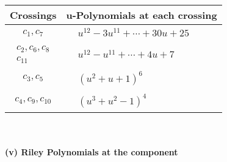 \documentclass[1p]{elsarticle_modified}
\theoremstyle{definition}
\begin{document}
\begin{tabular}{m{50pt}|m{274pt}}
Crossings & \hspace{64pt}u-Polynomials at each crossing \\
\hline $$\begin{aligned}c_{1},c_{7}\end{aligned}$$&$\begin{aligned}
&u^{12}-3 u^{11}+\cdots+30 u+25
\end{aligned}$\\
\hline $$\begin{aligned}c_{2},c_{6},c_{8}\\c_{11}\end{aligned}$$&$\begin{aligned}
&u^{12}- u^{11}+\cdots+4 u+7
\end{aligned}$\\
\hline $$\begin{aligned}c_{3},c_{5}\end{aligned}$$&$\begin{aligned}
&(u^2+u+1)^6
\end{aligned}$\\
\hline $$\begin{aligned}c_{4},c_{9},c_{10}\end{aligned}$$&$\begin{aligned}
&(u^3+u^2-1)^4
\end{aligned}$\\
\hline
\end{tabular}\\~\\
\newpage\renewcommand{\arraystretch}{1}
\flushleft \textbf{(v) Riley Polynomials at the component}\newline \\
\end{document}
